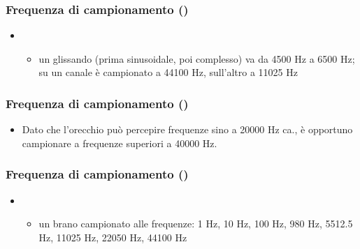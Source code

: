 \begin{frame}
    \frametitle{Frequenza di campionamento ()}

  \vspace{-1ex}
	\begin{itemize}

		\item {}

      \vspace{-1ex}
			\begin{itemize}

				\item un glissando (prima sinusoidale, poi complesso)
					  va da 4500 Hz a 6500 Hz;
					  su un canale \`e campionato a 44100 Hz,
                      sull'altro a 11025 Hz

					  \begin{center}
					  \end{center}

			\end{itemize}

	\end{itemize}

\end{frame}

\begin{frame}
    \frametitle{Frequenza di campionamento ()}

	\begin{itemize}

		\item Dato che l'orecchio pu\`o percepire
			  frequenze sino a 20000 Hz ca.,
			  \`e opportuno campionare a frequenze superiori a 40000 Hz.

	\end{itemize}

\end{frame}

\begin{frame}
    \frametitle{Frequenza di campionamento ()}

	\begin{itemize}

		\item {}

			\begin{itemize}

				\item un brano campionato alle frequenze:
                      1 Hz, 10 Hz, 100 Hz, 980 Hz, 
                      5512.5 Hz, 11025 Hz, 22050 Hz, 44100 Hz

					  \begin{center}
					  \end{center}
			\end{itemize}

	\end{itemize}

\end{frame}
